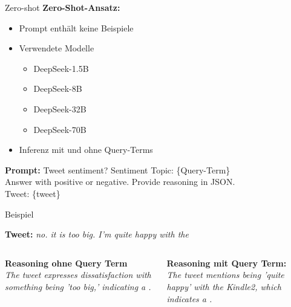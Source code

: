 \documentclass[aspectratio=169]{beamer} %
\begin{document}
\begin{frame}{Zero-shot}
  \textbf{Zero-Shot-Ansatz:}

  \vspace{0.35cm}

  \begin{itemize}
      \item Prompt enthält keine Beispiele
      \item Verwendete Modelle
      \begin{itemize}
          \item DeepSeek-1.5B
          \item DeepSeek-8B
          \item DeepSeek-32B
          \item DeepSeek-70B
      \end{itemize}
      \item Inferenz mit und ohne Query-Terms
  \end{itemize}
  \vspace{0.2cm}
  \centering
  \textbf{Prompt:} Tweet sentiment? Sentiment Topic: \{Query-Term\} \\
  Answer with positive or negative. Provide reasoning in JSON.\\
    Tweet: \glqq\{tweet\}\grqq
\end{frame}

\begin{frame}{Beispiel}
\begin{center}
    \textbf{Tweet:} \glqq \textit{no. it is too big. I'm quite happy with the \grqq}
    \vspace{0.45cm}
    \begin{columns}
        \begin{column}{0.45\textwidth}
            \textbf{Reasoning ohne Query Term} \\
            \vspace{0.4cm}
            \glqq \textit{The tweet expresses dissatisfaction with something being 'too big,' indicating a .\grqq}
        \end{column}
        \begin{column}{0.45\textwidth}
            \textbf{Reasoning mit Query Term:} \\
            \vspace{0.4cm}
            \glqq \textit{The tweet mentions being 'quite happy' with the Kindle2, which indicates a .\grqq}
        \end{column}
    \end{columns}
\end{center}

\end{frame}
\end{document}
